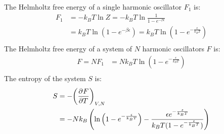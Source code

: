 \documentclass{article}
\begin{document}
\clearpage

The Helmholtz free energy of a single harmonic oscillator $F_1$ is:
\begin{equation}
    \begin{split}
        F_1 & = -k_BT\ln Z = -k_BT\ln \frac{1}{1 - e^{-\beta\epsilon}} \\
        & = k_BT\ln\left(1 - e^{-\beta\epsilon}\right) = k_BT\ln\left(1 - e^{-\frac{\epsilon}{k_BT}}\right) \\
    \end{split}
\end{equation}
The Helmholtz free energy of a system of $N$ harmonic oscillators $F$ is:
\begin{equation}
    \begin{split}
        F = NF_1 & = Nk_BT\ln\left(1 - e^{-\frac{\epsilon}{k_BT}}\right) \\
    \end{split}
\end{equation}
The entropy of the system $S$ is:
\begin{equation}
    \begin{split}
        S & = -{\left(\frac{\partial^{}F} {\partial T^{}}\right)}_{V,N} \\
        & = -Nk_B\left(\ln\left(1 - e^{-\frac{\epsilon}{k_BT}}\right) - \frac{\epsilon e^{-\frac{\epsilon}{k_BT}}}{k_BT(1 - e^{-\frac{\epsilon}{k_BT}})}\right)
    \end{split}
\end{equation}

\clearpage
\end{document}
